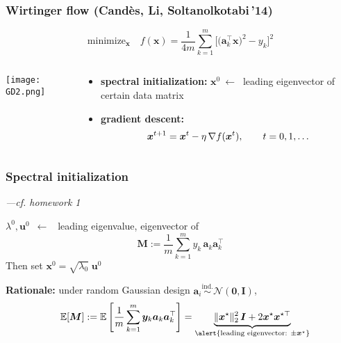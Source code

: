 \documentclass[compress,
mathserif,wide,%
]{beamer}
\begin{document}
\begin{frame}
\frametitle{Wirtinger flow (Cand\`es, Li, Soltanolkotabi\,'14)}

\[
\text{minimize}_{\bm{x}}\quad f(\bm{x})=\frac{1}{4m}\sum_{k=1}^{m}\Big[ \big(\bm{a}_{k}^{\top}\bm{x}\big)^{2}-y_{k} \Big]^{2}
\]


\pause

\vspace{-2em}


\begin{columns}
\begin{column}{0.3\textwidth}

\begin{center}
  \texttt{[image: GD2.png]}
\end{center}

\end{column}



\begin{column}{0.7\textwidth}

\begin{itemize}
\itemsep1em
\item {\bf spectral initialization:}  $\bm{x}^{0}~\leftarrow~$ leading eigenvector of certain data matrix
\pause
\item {\bf gradient descent:}  
\[
  \bm{x}^{t+1}= \bm{x}^t- \eta \, \nabla f(\bm{x}^t), \qquad t=0,1,\ldots
\]
\end{itemize}

\end{column}
\end{columns}

\end{frame}



\begin{frame}
\frametitle{Spectral initialization}
{\em \hfill ---cf. homework 1}

	$\lambda^0, \bm{u}^0 $~$\longleftarrow$~ leading eigenvalue, eigenvector of 
	\[
		\bm{M}:=\frac{1}{m}\sum_{k=1}^m y_k \,
		\bm{a}_k\bm{a}_k^{\top}
	\]
	Then set $\bm{x}^0 = \sqrt{\lambda_0} \; \bm{u}^0$

\vfill
	{\bf Rationale:} under random Gaussian design $\bm{a}_i \overset{\mathrm{ind.}}{\sim} \mathcal{N}(\bm{0},\bm{I})$,
	\begin{align*}
		\quad \E[\bm{M}] := \E \left[\frac{1}{m} \sum_{k = 1}^m \bm{y}_k \bm{a}_k \bm{a}_k^{\top} \right] = 
		\underset{\alert{\text{leading eigenvector: }\pm\bm{x}^{\star}}}{\underbrace{ \|\bm{x}^{\star}\|_2^2\, \bm{I} + 2 \bm{x}^{\star}\bm{x}^{\star\top}  }}
	\end{align*}

\end{frame}
\end{document}
